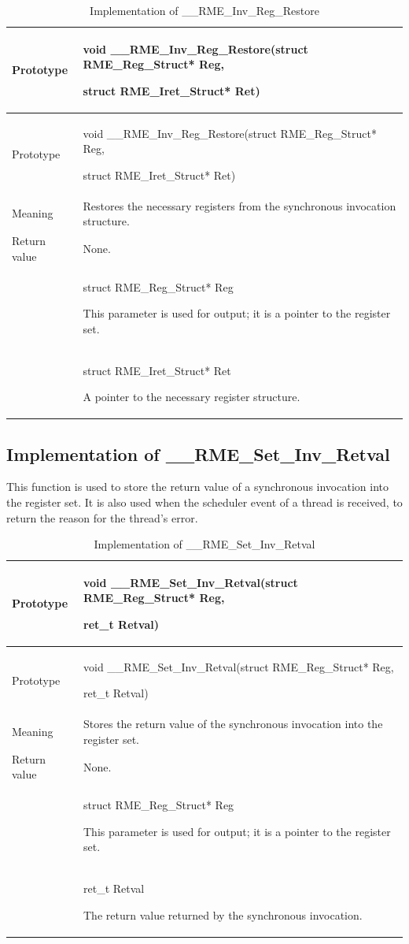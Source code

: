 \begin{xltabular}{\textwidth}{@{}>{\hsize\raggedright\arraybackslash}X>{\hsize\raggedright\arraybackslash}X@{}}
\caption{Implementation of \_\_RME\_Inv\_Reg\_Restore}\label{tab:7-67-rme-inv-reg-restore-implementation}\\
\toprule
Prototype\strut
 & void \_\_RME\_Inv\_Reg\_Restore(struct RME\_Reg\_Struct* Reg,

struct RME\_Iret\_Struct* Ret)\strut
\tabularnewline
\endfirsthead
\toprule
Prototype\strut
 & void \_\_RME\_Inv\_Reg\_Restore(struct RME\_Reg\_Struct* Reg,

struct RME\_Iret\_Struct* Ret)\strut
\tabularnewline
\midrule
\endhead
\bottomrule
\endlastfoot
Meaning & Restores the necessary registers from the synchronous invocation structure.\tabularnewline
Return value & None.\tabularnewline
{} & struct RME\_Reg\_Struct* Reg

This parameter is used for output; it is a pointer to the register set.\strut
\tabularnewline
\strut
 & struct RME\_Iret\_Struct* Ret

A pointer to the necessary register structure.\strut
\tabularnewline
\end{xltabular}
\nopagebreak[4]

\subsection{Implementation of \_\_RME\_Set\_Inv\_Retval}\label{subsec:7-rme-set-inv-retval-implementation}

This function is used to store the return value of a synchronous invocation into the register set. It is also used when the scheduler event of a thread is received, to return the reason for the thread's error.

\begin{xltabular}{\textwidth}{@{}>{\hsize\raggedright\arraybackslash}X>{\hsize\raggedright\arraybackslash}X@{}}
\caption{Implementation of \_\_RME\_Set\_Inv\_Retval}\label{tab:7-68-rme-set-inv-retval-implementation}\\
\toprule
Prototype\strut
 & void \_\_RME\_Set\_Inv\_Retval(struct RME\_Reg\_Struct* Reg,

ret\_t Retval)\strut
\tabularnewline
\endfirsthead
\toprule
Prototype\strut
 & void \_\_RME\_Set\_Inv\_Retval(struct RME\_Reg\_Struct* Reg,

ret\_t Retval)\strut
\tabularnewline
\midrule
\endhead
\bottomrule
\endlastfoot
Meaning & Stores the return value of the synchronous invocation into the register set.\tabularnewline
Return value & None.\tabularnewline
{} & struct RME\_Reg\_Struct* Reg

This parameter is used for output; it is a pointer to the register set.\strut
\tabularnewline
\strut
 & ret\_t Retval

The return value returned by the synchronous invocation.\strut
\tabularnewline
\end{xltabular}
\nopagebreak[4]

